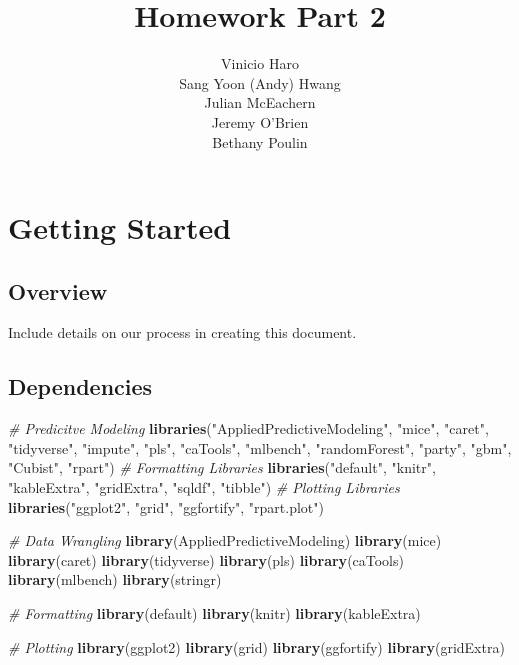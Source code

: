 \documentclass[]{report}
\title{Homework Part 2}
\author{Vinicio Haro \\ Sang Yoon (Andy) Hwang \\ Julian McEachern \\ Jeremy O'Brien \\ Bethany Poulin}
\date{}
\newenvironment{Shaded}{\begin{snugshade}}{\end{snugshade}}
\newcommand{\CommentTok}[1]{\textcolor[rgb]{0.56,0.35,0.01}{\textit{#1}}}
\newcommand{\KeywordTok}[1]{\textcolor[rgb]{0.13,0.29,0.53}{\textbf{#1}}}
\newcommand{\NormalTok}[1]{#1}
\newcommand{\StringTok}[1]{\textcolor[rgb]{0.31,0.60,0.02}{#1}}
\begin{document}
\maketitle

{
\setcounter{tocdepth}{2}
\tableofcontents
}
\hypertarget{Overview}{%
\chapter*{Getting Started}\label{Overview}}

\hypertarget{overview}{%
\section{Overview}\label{overview}}

Include details on our process in creating this document.

\hypertarget{dependencies}{%
\section{Dependencies}\label{dependencies}}

\begin{Shaded}
\begin{Highlighting}[]
\CommentTok{# Predicitve Modeling}
\KeywordTok{libraries}\NormalTok{(}\StringTok{"AppliedPredictiveModeling"}\NormalTok{, }\StringTok{"mice"}\NormalTok{, }\StringTok{"caret"}\NormalTok{, }\StringTok{"tidyverse"}\NormalTok{, }
    \StringTok{"impute"}\NormalTok{, }\StringTok{"pls"}\NormalTok{, }\StringTok{"caTools"}\NormalTok{, }\StringTok{"mlbench"}\NormalTok{, }\StringTok{"randomForest"}\NormalTok{, }\StringTok{"party"}\NormalTok{, }
    \StringTok{"gbm"}\NormalTok{, }\StringTok{"Cubist"}\NormalTok{, }\StringTok{"rpart"}\NormalTok{)}
\CommentTok{# Formatting Libraries}
\KeywordTok{libraries}\NormalTok{(}\StringTok{"default"}\NormalTok{, }\StringTok{"knitr"}\NormalTok{, }\StringTok{"kableExtra"}\NormalTok{, }\StringTok{"gridExtra"}\NormalTok{, }\StringTok{"sqldf"}\NormalTok{, }
    \StringTok{"tibble"}\NormalTok{)}
\CommentTok{# Plotting Libraries}
\KeywordTok{libraries}\NormalTok{(}\StringTok{"ggplot2"}\NormalTok{, }\StringTok{"grid"}\NormalTok{, }\StringTok{"ggfortify"}\NormalTok{, }\StringTok{"rpart.plot"}\NormalTok{)}

\CommentTok{# Data Wrangling}
\KeywordTok{library}\NormalTok{(AppliedPredictiveModeling)}
\KeywordTok{library}\NormalTok{(mice)}
\KeywordTok{library}\NormalTok{(caret)}
\KeywordTok{library}\NormalTok{(tidyverse)}
\KeywordTok{library}\NormalTok{(pls)}
\KeywordTok{library}\NormalTok{(caTools)}
\KeywordTok{library}\NormalTok{(mlbench)}
\KeywordTok{library}\NormalTok{(stringr)}

\CommentTok{# Formatting}
\KeywordTok{library}\NormalTok{(default)}
\KeywordTok{library}\NormalTok{(knitr)}
\KeywordTok{library}\NormalTok{(kableExtra)}

\CommentTok{# Plotting}
\KeywordTok{library}\NormalTok{(ggplot2)}
\KeywordTok{library}\NormalTok{(grid)}
\KeywordTok{library}\NormalTok{(ggfortify)}
\KeywordTok{library}\NormalTok{(gridExtra)}
\end{Highlighting}
\end{Shaded}
\end{document}
